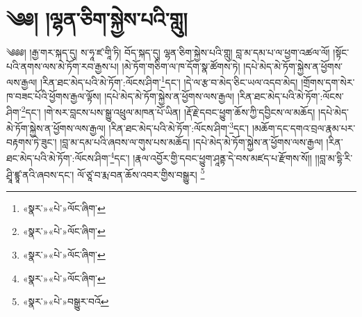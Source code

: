 \chapter{༄༅། །ལྷན་ཅིག་སྐྱེས་པའི་གླུ།}༄༅༅། །རྒྱ་གར་སྐད་དུ། ས་ཧཱ་ཛ་གཱི་ཏི། བོད་སྐད་དུ། ལྷན་ཅིག་སྐྱེས་པའི་གླུ། བླ་མ་དམ་པ་ལ་ཕྱག་འཚལ་ལོ། །སྟོང་པའི་ནགས་ལས་མེ་ཏོག་རབ་རྒྱས་པ། །མེ་ཏོག་གཅིག་ལ་ཁ་དོག་སྣ་ཚོགས་ཏེ། །དཔེ་མེད་མེ་ཏོག་སྐྱེས་ན་ཕྱོགས་ལས་རྒྱལ། །རིན་ཐང་མེད་པའི་མེ་ཏོག་:ལོངས་ཤིག་\footnote{«སྣར་»«པེ་»ལོང་ཞིག་}དང་། །དེ་ལ་རྩ་བ་མེད་ཅིང་ཡལ་འདབ་མེད། །གྲོགས་དག་སེར་ཁ་བཟང་པོའི་ཕྱོགས་རྒྱལ་ལྟོས། །དཔེ་མེད་མེ་ཏོག་སྐྱེས་ན་ཕྱོགས་ལས་རྒྱལ། །རིན་ཐང་མེད་པའི་མེ་ཏོག་:ལོངས་ཤིག་\footnote{«སྣར་»«པེ་»ལོང་ཞིག་}དང་། །གེ་སར་བླངས་པས་སྒྱུ་འཕྲུལ་མཁན་པོ་ཡིན། །རྡོ་རྗེ་དབང་ཕྱུག་ཆོས་ཀྱི་དབྱིངས་ལ་མཆོད། །དཔེ་མེད་མེ་ཏོག་སྐྱེས་ན་ཕྱོགས་ལས་རྒྱལ། །རིན་ཐང་མེད་པའི་མེ་ཏོག་:ལོངས་ཤིག་\footnote{«སྣར་»«པེ་»ལོང་ཞིག་}དང་། །མཆོག་དང་དགའ་བྲལ་རྣམ་པར་བརྟགས་ཏེ་ཟུང་། །བླ་མ་དམ་པའི་ཞབས་ལ་གུས་པས་མཆོད། །དཔེ་མེད་མེ་ཏོག་སྐྱེས་ན་ཕྱོགས་ལས་རྒྱལ། །རིན་ཐང་མེད་པའི་མེ་ཏོག་:ལོངས་ཤིག་\footnote{«སྣར་»«པེ་»ལོང་ཞིག་}དང་། །རྣལ་འབྱོར་གྱི་དབང་ཕྱུག་ཤཱནྟ་དེ་བས་མཛད་པ་རྫོགས་སོ།། །།བླ་མ་དྷི་རི་ཤྲཱི་ཛྙཱ་ནའི་ཞབས་དང་། ལོ་ཙཱ་བ་རྨ་བན་ཆོས་འབར་གྱིས་བསྒྱུར། \footnote{«སྣར་»«པེ་»བསྒྱུར་བའོ }